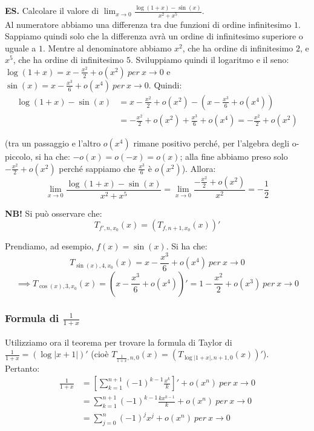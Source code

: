 \documentclass{article}
\begin{document}
\noindent\textbf{ES.} Calcolare il valore di $\lim_{x \to 0} \frac{\log(1 + x) - \sin(x)}{x^2 + x^5}$.\\
Al numeratore abbiamo una differenza tra due funzioni di ordine infinitesimo $1$. Sappiamo quindi solo che la differenza avrà un ordine di infinitesimo superiore o uguale a $1$. Mentre al denominatore abbiamo $x^2$, che ha ordine di infinitesimo $2$, e $x^5$, che ha ordine di infinitesimo $5$. Sviluppiamo quindi il logaritmo e il seno:
$\log(1 + x) = x - \frac{x^2}{2} + o(x^2) \ per \ x \to 0$ e $\sin(x) = x - \frac{x^3}{6} + o(x^4) \ per \ x \to 0$. Quindi:
\begin{align*}
    \log(1 + x) - \sin(x) &= x - \frac{x^2}{2} + o(x^2) - \left(x - \frac{x^3}{6} + o(x^4)\right) \\
    &= -\frac{x^2}{2} + o(x^2) + \frac{x^3}{6} + o(x^4) = -\frac{x^2}{2} + o(x^2)
\end{align*}

\noindent (tra un passaggio e l'altro $o(x^4)$ rimane positivo perché, per l'algebra degli o-piccolo, si ha che: $-o(x) = o(-x) = o(x)$; alla fine abbiamo preso solo $-\frac{x^2}{2} + o(x^2)$ perché sappiamo che $\frac{x^3}{6}$ è $o(x^2)$). Allora:
\begin{equation*}
    \lim_{x \to 0} \frac{\log(1 + x) - \sin(x)}{x^2 + x^5} = \lim_{x \to 0} \frac{-\frac{x^2}{2} + o(x^2)}{x^2} = -\frac{1}{2}
\end{equation*}

\noindent\textbf{NB!} Si può osservare che:
\begin{equation*}
    T_{f', n, x_0}(x) = (T_{f, n + 1, x_0}(x))'
\end{equation*}

\noindent Prendiamo, ad esempio, $f(x) = \sin(x)$. Si ha che:
\begin{equation*}
    T_{\sin(x), 4, x_0}(x) = x - \frac{x^3}{6} + o(x^4) \ per \ x \to 0
\end{equation*}
\begin{equation*}
    \implies T_{\cos(x), 3, x_0}(x) = \left(x - \frac{x^3}{6} + o(x^4)\right)' = 1 - \frac{x^2}{2} + o(x^3) \ per \ x \to 0
\end{equation*}

\subsubsection{Formula di $\frac{1}{1 + x}$}
Utilizziamo ora il teorema per trovare la formula di Taylor di $\frac{1}{1 + x} = (\log|x + 1|)'$ (cioè $T_{\frac{1}{1 + x}, n, 0}(x) = (T_{\log|1 + x|, n + 1, 0}(x))'$).\\
Pertanto:
\begin{align*}
    \frac{1}{1 + x} &= \left[\sum_{k = 1}^{n + 1} (-1)^{k - 1} \frac{x^k}{k}\right]' + o(x^n) \ per \ x \to 0 \\
    &= \sum_{k = 1}^{n + 1} (-1)^{k - 1} \frac{kx^{k-1}}{k} + o(x^n)  \ per \ x \to 0 \\
    &= \sum_{j = 0}^{n} (-1)^j x^j + o(x^n)  \ per \ x \to 0 \\
\end{align*}
\end{document}
